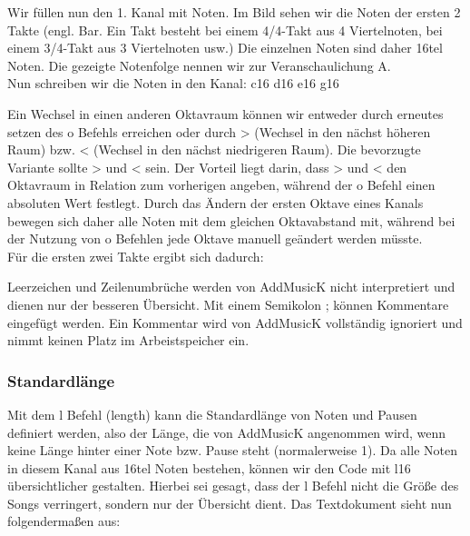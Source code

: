 \clearpage

Wir füllen nun den 1. Kanal mit Noten. Im Bild sehen wir die Noten der ersten 2 Takte (engl. Bar. Ein Takt besteht bei einem 4/4-Takt aus 4 Viertelnoten, bei einem 3/4-Takt aus 3 Viertelnoten usw.) Die einzelnen Noten sind daher 16tel Noten. Die gezeigte Notenfolge nennen wir zur Veranschaulichung A. \\
Nun schreiben wir die Noten in den Kanal: c16 d16 e16 g16

\bigskip

Ein Wechsel in einen anderen Oktavraum können wir entweder durch erneutes setzen des o Befehls erreichen oder durch > (Wechsel in den nächst höheren Raum) bzw. < (Wechsel in den nächst niedrigeren Raum). Die bevorzugte Variante sollte > und < sein. Der Vorteil liegt darin, dass > und < den Oktavraum in Relation zum vorherigen angeben, während der o Befehl einen absoluten Wert festlegt. Durch das Ändern der ersten Oktave eines Kanals bewegen sich daher alle Noten mit dem gleichen Oktavabstand mit, während bei der Nutzung von o Befehlen jede Oktave manuell geändert werden müsste. \\
Für die ersten zwei Takte ergibt sich dadurch:

\medskip



\medskip

Leerzeichen und Zeilenumbrüche werden von AddMusicK nicht interpretiert und dienen nur der besseren Übersicht.
Mit einem Semikolon ; können Kommentare eingefügt werden. Ein Kommentar wird von AddMusicK vollständig ignoriert und nimmt keinen Platz im Arbeistspeicher ein.

\subsubsection{Standardlänge}

Mit dem l Befehl (length) kann die Standardlänge von Noten und Pausen definiert werden, also der Länge, die von AddMusicK angenommen wird, wenn keine Länge hinter einer Note bzw. Pause steht (normalerweise 1). Da alle Noten in diesem Kanal aus 16tel Noten bestehen, können wir den Code mit l16 übersichtlicher gestalten. Hierbei sei gesagt, dass der l Befehl nicht die Größe des Songs verringert, sondern nur der Übersicht dient. Das Textdokument sieht nun folgendermaßen aus:

\clearpage

